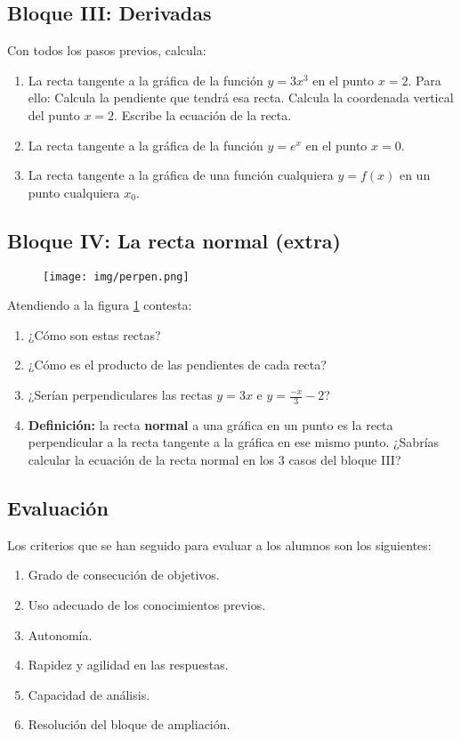 \documentclass[palatino,nobuilddate,nochap]{apuntesURJC}
\begin{document}
\vfill

\subsection{Bloque III: Derivadas}

Con todos los pasos previos, calcula:

\begin{enumerate}
	\item La recta tangente a la gráfica de la función $y=3x^3$ en el punto $x=2$. Para ello:
	\subitem Calcula la pendiente que tendrá esa recta.
	\subitem Calcula la coordenada vertical del punto $x=2$.
	\subitem Escribe la ecuación de la recta.
	\vspace{2cm}
	\item La recta tangente a la gráfica de la función $y=e^x$ en el punto $x=0$.
	\item La recta tangente a la gráfica de una función cualquiera $y=f(x)$ en un punto cualquiera $x_0$.
\end{enumerate}
\vspace{3cm}
\newpage
\subsection{Bloque IV: La recta normal (extra)}

\begin{figure}[hbtp]
\centering
\texttt{[image: img/perpen.png]}
\caption{}
\label{img:perpen}
\end{figure}


Atendiendo a la figura \ref{img:perpen} contesta:
\begin{enumerate}
	\item ¿Cómo son estas rectas?
	\item ¿Cómo es el producto de las pendientes de cada recta?
	\item ¿Serían perpendiculares las rectas $y=3x$ e $y=\frac{-x}{3}-2$?
	\item \textbf{Definición:} la recta \textbf{normal} a una gráfica en un punto es la recta perpendicular a la recta tangente a la gráfica en ese mismo punto.
	\subitem ¿Sabrías calcular la ecuación de la recta normal en los 3 casos del bloque III?
\end{enumerate}

\newpage
\subsection{Evaluación}
Los criterios que se han seguido para evaluar a los alumnos son los siguientes:
\begin{enumerate}
	\item Grado de consecución de objetivos.
	\item Uso adecuado de los conocimientos previos.
	\item Autonomía.
	\item Rapidez y agilidad en las respuestas.
	\item Capacidad de análisis.
	\item Resolución del bloque de ampliación.
\end{enumerate}



\printindex
\end{document}

